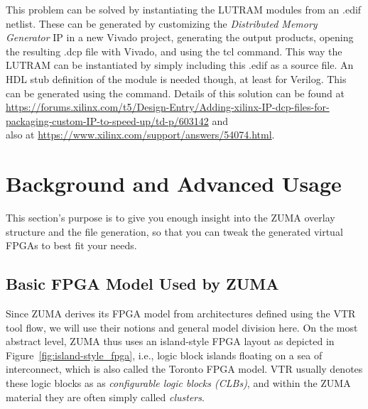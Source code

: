\documentclass{article}
\newcommand{\command}[1]{\texttt{\detokenize{#1}}}
\begin{document}
This problem can be solved by instantiating the LUTRAM modules from an .edif netlist. These can be generated by customizing the \emph{Distributed Memory Generator} IP in a new Vivado project, generating the output products, opening the resulting .dcp file with Vivado, and using the \command{write_edif} tcl command. This way the LUTRAM can be instantiated by simply including this .edif as a source file. An HDL stub definition of the module is needed though, at least for Verilog. This can be generated using the \command{write_verilog -mode port} command.
Details of this solution can be found at \url{https://forums.xilinx.com/t5/Design-Entry/Adding-xilinx-IP-dcp-files-for-packaging-custom-IP-to-speed-up/td-p/603142} and\\ also at \url{https://www.xilinx.com/support/answers/54074.html}.









\clearpage
\section{Background and Advanced Usage}
\label{sec:advancedusage}
This section's purpose is to give you enough insight into the ZUMA overlay structure and the file generation, so that you can tweak the generated virtual FPGAs to best fit your needs.





\subsection{Basic FPGA Model Used by ZUMA}
Since ZUMA derives its FPGA model from architectures defined using the VTR tool flow, we will use their notions and general model division here.
On the most abstract level, ZUMA thus uses an island-style FPGA layout as depicted in Figure~\ref{fig:island-style_fpga}, i.e., logic block islands floating on a sea of interconnect, which is also called the Toronto FPGA model.
VTR usually denotes these logic blocks as as \emph{configurable logic blocks (CLBs)}, and within the ZUMA material they are often simply called \emph{clusters}.
\end{document}
